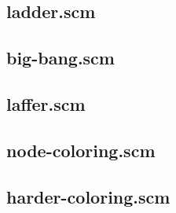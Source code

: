 \documentclass[12pt,a4paper]{article}
\begin{document}
\subsection{ladder.scm}

\subsection{big-bang.scm}

\subsection{laffer.scm}

\subsection{node-coloring.scm}

\subsection{harder-coloring.scm}

\end{document}
